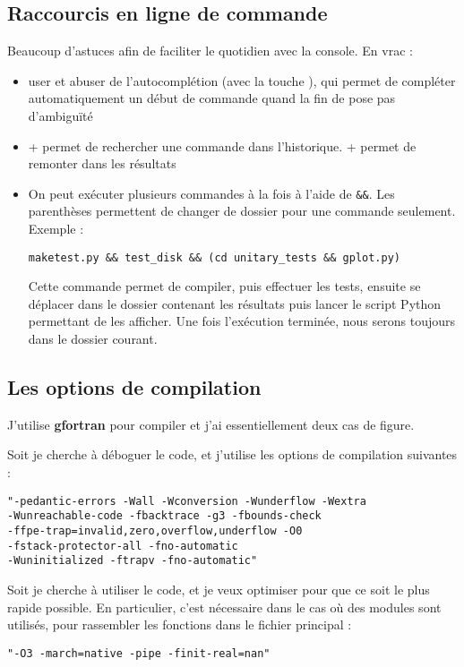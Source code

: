 \subsection{Raccourcis en ligne de commande}
Beaucoup d'astuces afin de faciliter le quotidien avec la console. En vrac : 
\begin{itemize}
\item user et abuser de l'autocomplétion (avec la touche ), qui permet de compléter automatiquement un début de commande quand la fin de pose pas d'ambiguïté
\item {} +  permet de rechercher une commande dans l'historique.  +  permet de remonter dans les résultats
\item On peut exécuter plusieurs commandes à la fois à l'aide de \verb|&&|. Les parenthèses permettent de changer de dossier pour une commande seulement. Exemple : \\
\begin{verbatim}
maketest.py && test_disk && (cd unitary_tests && gplot.py)
\end{verbatim}

Cette commande permet de compiler, puis effectuer les tests, ensuite se déplacer dans le dossier contenant les résultats puis lancer le script Python permettant de les afficher. Une fois l'exécution terminée, nous serons toujours dans le dossier courant.
\end{itemize}

\subsection{Les options de compilation}
J'utilise \textbf{gfortran} pour compiler et j'ai essentiellement deux cas de figure. 

Soit je cherche à déboguer le code, et j'utilise les options de compilation suivantes : 
\begin{verbatim}
"-pedantic-errors -Wall -Wconversion -Wunderflow -Wextra 
-Wunreachable-code -fbacktrace -g3 -fbounds-check
-ffpe-trap=invalid,zero,overflow,underflow -O0
-fstack-protector-all -fno-automatic 
-Wuninitialized -ftrapv -fno-automatic"
\end{verbatim}

Soit je cherche à utiliser le code, et je veux optimiser pour que ce soit le plus rapide possible. En particulier, c'est nécessaire dans le cas où des modules sont utilisés, pour rassembler les fonctions dans le fichier principal : 
\begin{verbatim}
"-O3 -march=native -pipe -finit-real=nan"
\end{verbatim}


